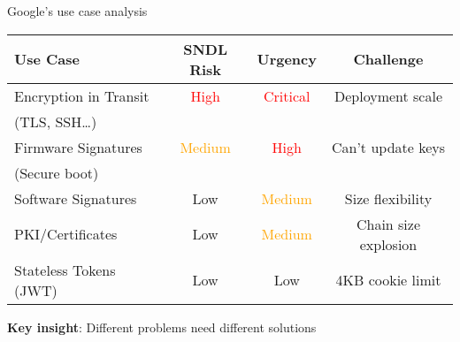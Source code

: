 \documentclass[aspectratio=169, lualatex, handout]{beamer}
\begin{document}
\begin{frame}{Google's use case analysis}
	\begin{center}
		\begin{tabular}{|l|c|c|c|}
			\hline
			\textbf{Use Case}      & \textbf{SNDL Risk}              & \textbf{Urgency}                & \textbf{Challenge}   \\
			\hline
			\hline
			Encryption in Transit  & \textcolor{red}{High}           & \textcolor{red}{Critical}       & Deployment scale     \\
			(TLS, SSH\ldots)       &                                 &                                 &                      \\
			\hline
			Firmware Signatures    & \textcolor{orange}{Medium}      & \textcolor{red}{High}           & Can't update keys    \\
			(Secure boot)          &                                 &                                 &                      \\
			\hline
			Software Signatures    & \textcolor{green!70!black}{Low} & \textcolor{orange}{Medium}      & Size flexibility     \\
			\hline
			PKI/Certificates       & \textcolor{green!70!black}{Low} & \textcolor{orange}{Medium}      & Chain size explosion \\
			\hline
			Stateless Tokens (JWT) & \textcolor{green!70!black}{Low} & \textcolor{green!70!black}{Low} & 4KB cookie limit     \\
			\hline
		\end{tabular}
	\end{center}
	\vspace{3mm}
	\textbf{Key insight}: Different problems need different solutions
\end{frame}
\end{document}
